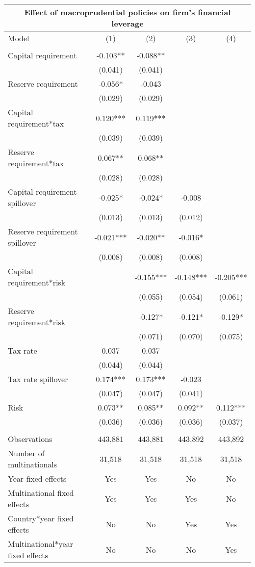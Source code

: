 \begin{tabular}{lcccc}
\multicolumn{5}{c}{Effect of macroprudential policies on firm's financial leverage} \\ \hline
Model & (1) & (2) & (3) & (4) \\ \hline
 &  &  &  &  \\
Capital requirement & -0.103** & -0.088** &  &  \\
 & (0.041) & (0.041) &  &  \\
Reserve requirement & -0.056* & -0.043 &  &  \\
 & (0.029) & (0.029) &  &  \\
Capital requirement*tax & 0.120*** & 0.119*** &  &  \\
 & (0.039) & (0.039) &  &  \\
Reserve requirement*tax & 0.067** & 0.068** &  &  \\
 & (0.028) & (0.028) &  &  \\
Capital requirement spillover & -0.025* & -0.024* & -0.008 &  \\
 & (0.013) & (0.013) & (0.012) &  \\
Reserve requirement spillover & -0.021*** & -0.020** & -0.016* &  \\
 & (0.008) & (0.008) & (0.008) &  \\
Capital requirement*risk &  & -0.155*** & -0.148*** & -0.205*** \\
 &  & (0.055) & (0.054) & (0.061) \\
Reserve requirement*risk &  & -0.127* & -0.121* & -0.129* \\
 &  & (0.071) & (0.070) & (0.075) \\
Tax rate & 0.037 & 0.037 &  &  \\
 & (0.044) & (0.044) &  &  \\
Tax rate spillover & 0.174*** & 0.173*** & -0.023 &  \\
 & (0.047) & (0.047) & (0.041) &  \\
Risk & 0.073** & 0.085** & 0.092** & 0.112*** \\
 & (0.036) & (0.036) & (0.036) & (0.037) \\
  &  &  &  &  \\
Observations & 443,881 & 443,881 & 443,892 & 443,892 \\
Number of multinationals & 31,518 & 31,518 & 31,518 & 31,518 \\
Year fixed effects & Yes & Yes & No & No \\
Multinational fixed effects & Yes & Yes & Yes & No \\
Country*year fixed effects & No & No & Yes & Yes \\
 Multinational*year fixed effects & No & No & No & Yes \\ \hline

\end{tabular}

